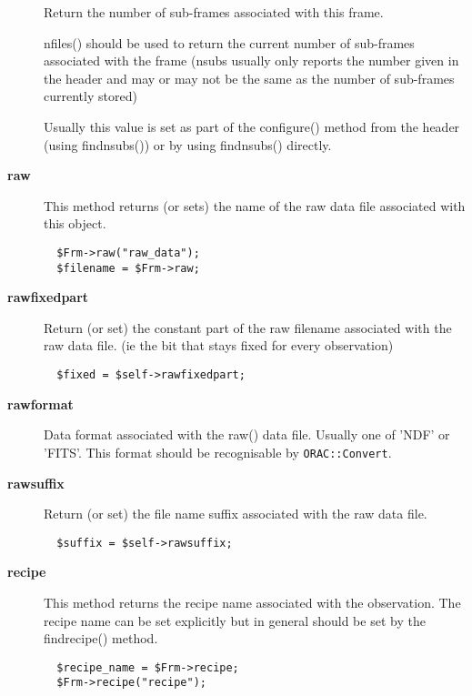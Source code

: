 \begin{description}
Return the number of sub-frames associated with this frame.



nfiles() should be used to return the current number of sub-frames
associated with the frame (nsubs usually only reports the number given
in the header and may or may not be the same as the number of sub-frames
currently stored)



Usually this value is set as part of the configure() method from
the header (using findnsubs()) or by using findnsubs() directly.

\item[\textbf{raw}] \mbox{}

This method returns (or sets) the name of the raw data file
associated with this object.

\begin{verbatim}
  $Frm->raw("raw_data");
  $filename = $Frm->raw;
\end{verbatim}
\item[\textbf{rawfixedpart}] \mbox{}

Return (or set) the constant part of the raw filename associated
with the raw data file. (ie the bit that stays fixed for every 
observation)

\begin{verbatim}
  $fixed = $self->rawfixedpart;
\end{verbatim}
\item[\textbf{rawformat}] \mbox{}

Data format associated with the raw() data file.
Usually one of 'NDF' or 'FITS'. This format should be
recognisable by \texttt{ORAC::Convert}.

\item[\textbf{rawsuffix}] \mbox{}

Return (or set) the file name suffix associated with
the raw data file.

\begin{verbatim}
  $suffix = $self->rawsuffix;
\end{verbatim}
\item[\textbf{recipe}] \mbox{}

This method returns the recipe name associated with the observation.
The recipe name can be set explicitly but in general should be
set by the findrecipe() method.

\begin{verbatim}
  $recipe_name = $Frm->recipe;
  $Frm->recipe("recipe");
\end{verbatim}



\end{description}
